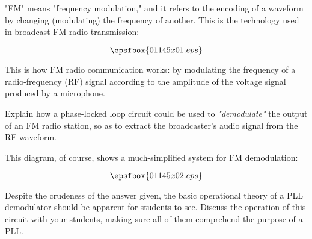 

"FM" means "frequency modulation," and it refers to the encoding of a waveform by changing (modulating) the frequency of another.  This is the technology used in broadcast FM radio transmission:

$$\epsfbox{01145x01.eps}$$

This is how FM radio communication works: by modulating the frequency of a radio-frequency (RF) signal according to the amplitude of the voltage signal produced by a microphone.

Explain how a phase-locked loop circuit could be used to {\it "demodulate"} the output of an FM radio station, so as to extract the broadcaster's audio signal from the RF waveform.







This diagram, of course, shows a much-simplified system for FM demodulation:

$$\epsfbox{01145x02.eps}$$







Despite the crudeness of the answer given, the basic operational theory of a PLL demodulator should be apparent for students to see.  Discuss the operation of this circuit with your students, making sure all of them comprehend the purpose of a PLL.



